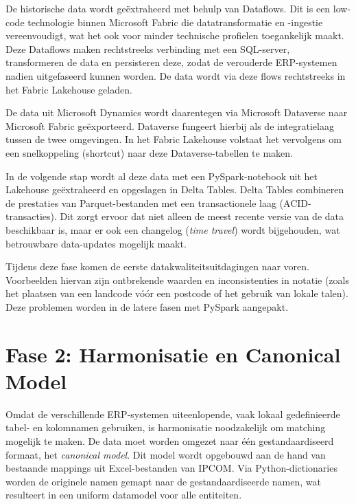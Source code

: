 De historische data wordt geëxtraheerd met behulp van Dataflows. Dit is een low-code technologie binnen Microsoft Fabric die datatransformatie en -ingestie vereenvoudigt, wat het ook voor minder technische profielen toegankelijk maakt. Deze Dataflows maken rechtstreeks verbinding met een SQL-server, transformeren de data en persisteren deze, zodat de verouderde ERP-systemen nadien uitgefaseerd kunnen worden. De data wordt via deze flows rechtstreeks in het Fabric Lakehouse geladen.

De data uit Microsoft Dynamics wordt daarentegen via Microsoft Dataverse naar Microsoft Fabric geëxporteerd. Dataverse fungeert hierbij als de integratielaag tussen de twee omgevingen. In het Fabric Lakehouse volstaat het vervolgens om een snelkoppeling (shortcut) naar deze Dataverse-tabellen te maken.

In de volgende stap wordt al deze data met een PySpark-notebook uit het Lakehouse geëxtraheerd en opgeslagen in Delta Tables. Delta Tables combineren de prestaties van Parquet-bestanden met een transactionele laag (ACID-transacties). Dit zorgt ervoor dat niet alleen de meest recente versie van de data beschikbaar is, maar er ook een changelog (\textit{time travel}) wordt bijgehouden, wat betrouwbare data-updates mogelijk maakt.

Tijdens deze fase komen de eerste datakwaliteitsuitdagingen naar voren. Voorbeelden hiervan zijn ontbrekende waarden en inconsistenties in notatie (zoals het plaatsen van een landcode vóór een postcode of het gebruik van lokale talen). Deze problemen worden in de latere fasen met PySpark aangepakt.

\section{Fase 2: Harmonisatie en Canonical Model}%
\label{sec:poc-harmonisatie}



Omdat de verschillende ERP-systemen uiteenlopende, vaak lokaal gedefinieerde tabel- en kolomnamen gebruiken, is harmonisatie noodzakelijk om matching mogelijk te maken. De data moet worden omgezet naar één gestandaardiseerd formaat, het \textit{canonical model}. Dit model wordt opgebouwd aan de hand van bestaande mappings uit Excel-bestanden van IPCOM. Via Python-dictionaries worden de originele namen gemapt naar de gestandaardiseerde namen, wat resulteert in een uniform datamodel voor alle entiteiten.


